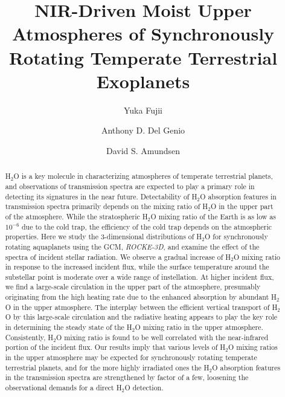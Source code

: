 \documentclass[11pt,numberedappendix,twocolappendix,]{emulateapj}
\def\water{H$_2$O }
\def\modelE{{\it ROCKE-3D}}
\begin{document}
\title{NIR-Driven Moist Upper Atmospheres of Synchronously Rotating Temperate Terrestrial Exoplanets}
\author{Yuka Fujii}
\author{Anthony D. Del Genio}
\author{David S. Amundsen}

\begin{abstract}

\water is a key molecule in characterizing atmospheres of temperate terrestrial planets, and observations of transmission spectra are expected to play a primary role in detecting its signatures in the near future. 
%
Detectability of \water absorption features in transmission spectra primarily depends on the mixing ratio of \water in the upper part of the atmosphere. 
%
While the stratospheric \water mixing ratio of the Earth is as low as $10^{-6}$ due to the cold trap, the efficiency of the cold trap depends on the atmospheric properties. 
%
Here we study the 3-dimensional distributions of \water for synchronously rotating aquaplanets using the GCM, \modelE, and examine the effect of the  spectra of incident stellar radiation. 
%
We observe a gradual increase of \water mixing ratio in response to the increased incident flux, while the surface temperature around the substellar point is moderate over a wide range of instellation. 
%
At higher incident flux, we find a large-scale circulation in the upper part of the atmosphere, presumably originating from the high heating rate due to the enhanced absorption by abundant \water in the upper atmosphere. 
%
The interplay between the efficient vertical transport of \water by this large-scale circulation and the radiative heating appears to play the key role in determining the steady state of the \water mixing ratio in the upper atmosphere.  
%
Consistently, \water mixing ratio is found to be well correlated with the near-infrared portion of the incident flux. 
%
Our results imply that various levels of \water mixing ratios in the upper atmosphere may be expected for synchronously rotating temperate terrestrial planets, and for the more highly irradiated ones the \water absorption features in the transmission spectra are strengthened by factor of a few, loosening the observational demands for a direct H$_2$O detection. 
%
\end{abstract}
\end{document}
